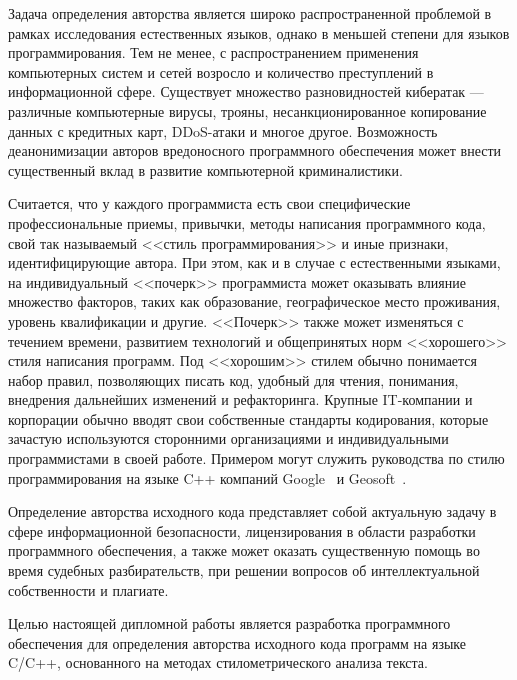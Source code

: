 Задача определения авторства является широко распространенной проблемой в рамках исследования 
естественных языков, однако в меньшей степени для языков программирования. 
Тем не менее, с распространением применения компьютерных систем и сетей возросло и количество преступлений в 
информационной сфере. Существует множество разновидностей кибератак --- различные компьютерные вирусы, 
трояны, несанкционированное копирование данных с кредитных карт, DDoS-атаки и многое другое. 
Возможность деанонимизации авторов вредоносного программного обеспечения может внести существенный вклад 
в развитие компьютерной криминалистики.

Считается, что у каждого программиста есть свои специфические профессиональные приемы, 
привычки, методы написания программного кода, свой так называемый <<стиль программирования>> и 
иные признаки, идентифицирующие автора. При этом, как и в случае с естественными языками, 
на индивидуальный <<почерк>> программиста может оказывать влияние
множество факторов, таких как образование, географическое место проживания, уровень квалификации и другие. 
<<Почерк>> также может изменяться с течением времени, развитием технологий и общепринятых норм <<хорошего>> стиля
написания программ. Под <<хорошим>> стилем обычно понимается набор правил, позволяющих писать 
код, удобный для чтения, понимания, внедрения дальнейших изменений и рефакторинга.
Крупные IT-компании и корпорации обычно вводят свои собственные стандарты кодирования, которые  
зачастую используются сторонними организациями и индивидуальными программистами в своей работе.
Примером могут служить руководства по стилю программирования на языке C++ компаний Google~\cite{google_style} и Geosoft~\cite{geosoft}.


Определение авторства исходного кода представляет собой актуальную задачу в сфере информационной 
безопасности, лицензирования в области разработки программного обеспечения, а также может оказать 
существенную помощь во время судебных разбирательств, при решении вопросов об интеллектуальной 
собственности и плагиате.

Целью настоящей дипломной работы является разработка программного обеспечения для определения авторства 
исходного кода программ на языке C/C++, основанного на методах стилометрического анализа текста.
